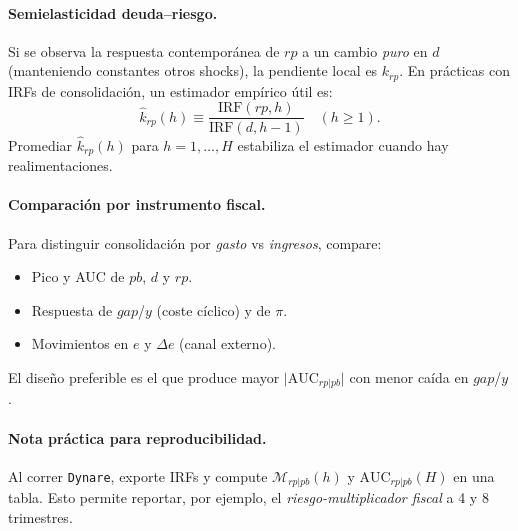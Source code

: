 \documentclass[12pt]{article}
\begin{document}
\paragraph{Semielasticidad deuda–riesgo.}
Si se observa la respuesta contemporánea de $rp$ a un cambio \emph{puro} en $d$ (manteniendo constantes otros shocks), la pendiente local es $k_{rp}$. En prácticas con IRFs de consolidación, un estimador empírico útil es:
\[
\widehat{k}_{rp}(h) \equiv
\frac{\text{IRF}(rp,h)}{\text{IRF}(d,h-1)}\quad (h\ge 1).
\]
Promediar $\widehat{k}_{rp}(h)$ para $h=1,\dots,H$ estabiliza el estimador cuando hay realimentaciones.

\paragraph{Comparación por instrumento fiscal.}
Para distinguir consolidación por \emph{gasto} vs \emph{ingresos}, compare:
\begin{itemize}
    \item Pico y AUC de $pb$, $d$ y $rp$.
    \item Respuesta de $gap$/$y$ (coste cíclico) y de $\pi$.
    \item Movimientos en $e$ y $\Delta e$ (canal externo).
\end{itemize}
El diseño preferible es el que produce mayor $\lvert \text{AUC}_{rp|pb}\rvert$ con menor caída en $gap$/$y$.

\paragraph{Nota práctica para reproducibilidad.}
Al correr \texttt{Dynare}, exporte IRFs y compute \(\mathcal{M}_{rp|pb}(h)\) y \(\text{AUC}_{rp|pb}(H)\) en una tabla. Esto permite reportar, por ejemplo, el \emph{riesgo-multiplicador fiscal} a 4 y 8 trimestres.

\end{document}
